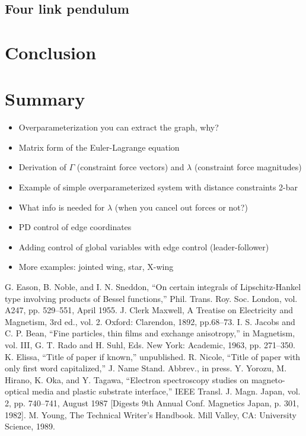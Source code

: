 \documentclass[conference]{article} %
\begin{document}
\subsection{Four link pendulum}

\section{Conclusion}

\section{Summary}
\begin{itemize}
    \item Overparameterization you can extract the graph, why?
    \item Matrix form of the Euler-Lagrange equation
    \item Derivation of $\Gamma$ (constraint force vectors) and $\lambda$ (constraint force magnitudes)
    \item Example of simple overparameterized system with distance constraints 2-bar
    \item What info is needed for $\lambda$ (when you cancel out forces or not?)
    \item PD control of edge coordinates
    \item Adding control of global variables with edge control (leader-follower)
    \item More examples: jointed wing, star, X-wing
\end{itemize}

\begin{thebibliography}{00}
 G. Eason, B. Noble, and I. N. Sneddon, ``On certain integrals of Lipschitz-Hankel type involving products of Bessel functions,'' Phil. Trans. Roy. Soc. London, vol. A247, pp. 529--551, April 1955.
 J. Clerk Maxwell, A Treatise on Electricity and Magnetism, 3rd ed., vol. 2. Oxford: Clarendon, 1892, pp.68--73.
 I. S. Jacobs and C. P. Bean, ``Fine particles, thin films and exchange anisotropy,'' in Magnetism, vol. III, G. T. Rado and H. Suhl, Eds. New York: Academic, 1963, pp. 271--350.
 K. Elissa, ``Title of paper if known,'' unpublished.
 R. Nicole, ``Title of paper with only first word capitalized,'' J. Name Stand. Abbrev., in press.
 Y. Yorozu, M. Hirano, K. Oka, and Y. Tagawa, ``Electron spectroscopy studies on magneto-optical media and plastic substrate interface,'' IEEE Transl. J. Magn. Japan, vol. 2, pp. 740--741, August 1987 [Digests 9th Annual Conf. Magnetics Japan, p. 301, 1982].
 M. Young, The Technical Writer's Handbook. Mill Valley, CA: University Science, 1989.
\end{thebibliography}
\end{document}
